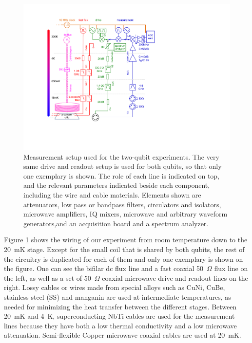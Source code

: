\begin{figure}[ht!]
	\centering
		\includegraphics[width=1.\textwidth]{"./material/figures/2-qubit-processor/measurement setup"}
	\caption[The measurement setup used for the two-qubit experiments]{Measurement setup used for the two-qubit experiments. The very same drive and readout setup is used for both qubits, so that only one exemplary is shown. The role of each line is indicated on top, and  the relevant parameters indicated beside each component, including the wire and cable materials. Elements shown are attenuators, low pass or bandpass filters, circulators and isolators, microwave amplifiers, IQ mixers, microwave and arbitrary waveform generators,and an acquisition board and a spectrum analyzer. }
	\label{fig:measurement_setup}
\end{figure}

Figure \ref{fig:measurement_setup} shows the wiring of our experiment from room temperature down to the 20~mK stage. Except for the small coil that is shared by both qubits, the rest of the circuitry is duplicated for each of them and only one exemplary is shown on the figure. One can see the bifilar dc flux line and a fast coaxial 50~$\Omega$ flux line on the left, as well as a set of 50~$\Omega$ coaxial microwave drive and readout lines on the right. Lossy cables or wires made from special alloys such as CuNi, CuBe, stainless steel (SS) and manganin are used at intermediate temperatures, as needed for minimizing the heat transfer between the different stages. Between 20~mK and 4~K, superconducting NbTi cables are used for the measurement lines because they have both a low thermal conductivity and a low microwave attenuation. Semi-flexible Copper microwave coaxial cables are used at 20~mK.

